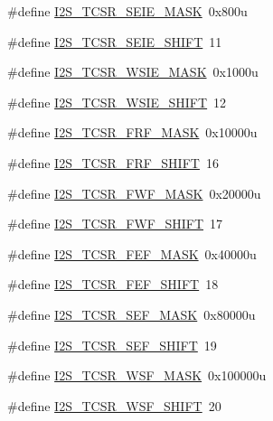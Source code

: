 \begin{DoxyCompactItemize}
\#define \hyperlink{group___i2_s___register___masks_gaf9e74dea26989013c641104d00be6e21}{I2\+S\+\_\+\+T\+C\+S\+R\+\_\+\+S\+E\+I\+E\+\_\+\+M\+A\+SK}~0x800u
\item 
\#define \hyperlink{group___i2_s___register___masks_gac1a9beb768f09b6866b75294f36a8331}{I2\+S\+\_\+\+T\+C\+S\+R\+\_\+\+S\+E\+I\+E\+\_\+\+S\+H\+I\+FT}~11
\item 
\#define \hyperlink{group___i2_s___register___masks_gae340c4e140f6777c4f3288008cef9807}{I2\+S\+\_\+\+T\+C\+S\+R\+\_\+\+W\+S\+I\+E\+\_\+\+M\+A\+SK}~0x1000u
\item 
\#define \hyperlink{group___i2_s___register___masks_ga80c64bdcf18c8ac184ac66c2517171eb}{I2\+S\+\_\+\+T\+C\+S\+R\+\_\+\+W\+S\+I\+E\+\_\+\+S\+H\+I\+FT}~12
\item 
\#define \hyperlink{group___i2_s___register___masks_ga370db03ac48bd51b4192f6e36b80cd43}{I2\+S\+\_\+\+T\+C\+S\+R\+\_\+\+F\+R\+F\+\_\+\+M\+A\+SK}~0x10000u
\item 
\#define \hyperlink{group___i2_s___register___masks_ga2dcefe209e87357f5e9d3c764c6da831}{I2\+S\+\_\+\+T\+C\+S\+R\+\_\+\+F\+R\+F\+\_\+\+S\+H\+I\+FT}~16
\item 
\#define \hyperlink{group___i2_s___register___masks_gabcaea4a4f528b0d25ff0f0b72d4a4c93}{I2\+S\+\_\+\+T\+C\+S\+R\+\_\+\+F\+W\+F\+\_\+\+M\+A\+SK}~0x20000u
\item 
\#define \hyperlink{group___i2_s___register___masks_ga7cb29b185e9330124f8777c090685d49}{I2\+S\+\_\+\+T\+C\+S\+R\+\_\+\+F\+W\+F\+\_\+\+S\+H\+I\+FT}~17
\item 
\#define \hyperlink{group___i2_s___register___masks_ga545f4444c3ca226a3318c67b76061406}{I2\+S\+\_\+\+T\+C\+S\+R\+\_\+\+F\+E\+F\+\_\+\+M\+A\+SK}~0x40000u
\item 
\#define \hyperlink{group___i2_s___register___masks_ga00880fa506ae5f85e2cf22d7251cc217}{I2\+S\+\_\+\+T\+C\+S\+R\+\_\+\+F\+E\+F\+\_\+\+S\+H\+I\+FT}~18
\item 
\#define \hyperlink{group___i2_s___register___masks_gaafdb1a4476b3a25a9f1af0475beb81d6}{I2\+S\+\_\+\+T\+C\+S\+R\+\_\+\+S\+E\+F\+\_\+\+M\+A\+SK}~0x80000u
\item 
\#define \hyperlink{group___i2_s___register___masks_gab079539e78cc6efb8d477dfe1f349f00}{I2\+S\+\_\+\+T\+C\+S\+R\+\_\+\+S\+E\+F\+\_\+\+S\+H\+I\+FT}~19
\item 
\#define \hyperlink{group___i2_s___register___masks_ga85bbf55e664f0a0b688fbb1c2db634e9}{I2\+S\+\_\+\+T\+C\+S\+R\+\_\+\+W\+S\+F\+\_\+\+M\+A\+SK}~0x100000u
\item 
\#define \hyperlink{group___i2_s___register___masks_gafbec49ae50a286ce9bc59f20cbcd6b4e}{I2\+S\+\_\+\+T\+C\+S\+R\+\_\+\+W\+S\+F\+\_\+\+S\+H\+I\+FT}~20

\end{DoxyCompactItemize}
